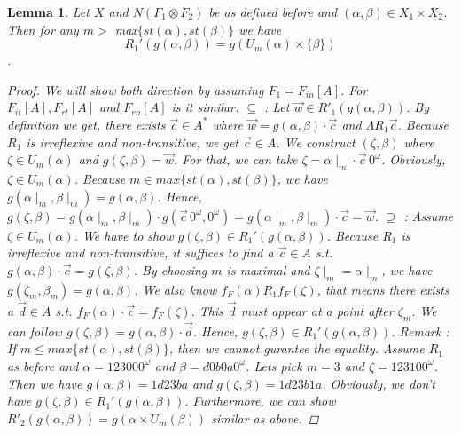 \documentclass[12pt, a4paper]{scrartcl}
\newtheorem{lemma}[definition]{Lemma}
\begin{document}
\begin{lemma}
    Let $X$ and $N(F_1 \otimes F_2)$ be as defined before and $(\alpha,\beta) \in X_1 \times X_2$. Then for any $m >$ max$\{st(\alpha), st(\beta)\}$ we have 
    $$R_1'(g(\alpha,\beta)) = g(U_m(\alpha) \times \{\beta\})$$.

    \begin{proof}
        We will show both direction by assuming $F_1 = F_{in}[A]$. For $F_{it}[A],F_{rt}[A]$ and $F_{rn}[A]$ is it similar. \newline
        $\subseteq$ : Let $\vec{w} \in R'_1(g(\alpha,\beta))$. By definition we get, there exists $\vec{c} \in A^*$ where $\vec{w} = g(\alpha,\beta) \cdot \vec{c}$ and $\Lambda R_1 \vec{c}$.
        Because $R_1$ is irreflexive and non-transitive, we get $\vec{c} \in A$. We construct $(\zeta,\beta)$ where $\zeta \in U_m(\alpha)$ and $g(\zeta,\beta) = \vec{w}$. For that, we can take $\zeta = \alpha \mid_m \cdot \vec{c}\, 0^\omega$. Obviously, $\zeta \in U_m(\alpha)$.
        Because $m \in max\{st(\alpha), st(\beta)\}$, we have $g(\alpha \mid_m, \beta \mid_m) = g(\alpha, \beta)$. Hence, $g(\zeta, \beta) = g(\alpha \mid_m, \beta \mid_m) \cdot g(\vec{c} \,0^\omega, 0^\omega) = g(\alpha \mid_m, \beta \mid_m) \cdot \vec{c} = \vec{w}$.
        \newline \newline
        $\supseteq$ : Assume $\zeta \in U_m(\alpha)$. We have to show $g(\zeta, \beta) \in R_1'(g(\alpha, \beta))$. Because $R_1$ is irreflexive and non-transitive, it suffices to find a $\vec{c} \in A$ s.t. $g(\alpha,\beta) \cdot \vec{c} = g(\zeta, \beta)$.
        By choosing $m$ is maximal and $\zeta \mid_m = \alpha \mid_m$, we have $g(\zeta_m, \beta_m) = g(\alpha,\beta)$. We also know $f_F(\alpha)R_1 f_F(\zeta)$, that means there exists a $\vec{d} \in A$ s.t. $f_F(\alpha) \cdot \vec{c} = f_F(\zeta)$. This $\vec{d}$ must appear at a point after $\zeta_m$.
        We can follow $g(\zeta, \beta) = g(\alpha, \beta) \cdot \vec{d}$. Hence, $g(\zeta, \beta) \in R_1'(g(\alpha,\beta))$.
        \newline \newline
        Remark : If $m \leq max\{st(\alpha), st(\beta)\}$, then we cannot gurantee the equality. Assume $R_1$ as before and $\alpha = 123000^\omega$ and $\beta = d0b0a0^\omega$.
        Lets pick $m = 3$ and $\zeta = 123100^\omega$. Then we have $g(\alpha, \beta) = 1d23ba$ and $g(\zeta, \beta) = 1d23b1a$. Obviously, we don't have $g(\zeta, \beta) \in R_1'(g(\alpha,\beta))$. \newline
        Furthermore, we can show $R'_2(g(\alpha,\beta)) = g(\alpha \times U_m(\beta))$ similar as above. 
        
    \end{proof}


\end{lemma}
\end{document}

